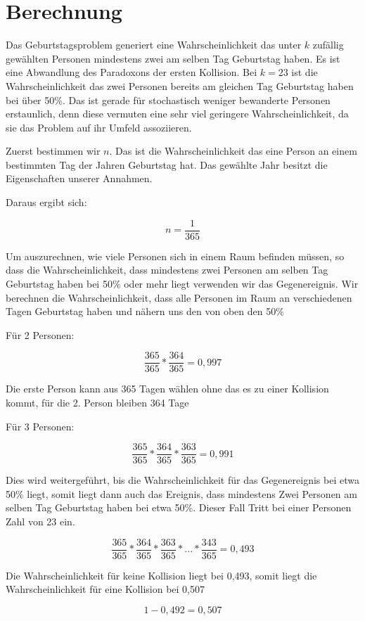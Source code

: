 \documentclass[../main.tex]{subfiles}
\begin{document}
\section{Berechnung}

Das Geburtstagsproblem generiert eine Wahrscheinlichkeit das unter \(k\) zufällig gewählten Personen mindestens zwei am
selben Tag Geburtstag haben. Es ist eine Abwandlung des Paradoxons der ersten Kollision. \cite{henze} Bei \(k=23\) ist die
Wahrscheinlichkeit das zwei Personen bereits am gleichen Tag Geburtstag haben bei über 50\%. Das ist gerade für
stochastisch weniger bewanderte Personen erstaunlich, denn diese vermuten eine sehr viel geringere Wahrscheinlichkeit,
da sie das Problem auf ihr Umfeld assoziieren.

Zuerst bestimmen wir \(n\). Das ist die Wahrscheinlichkeit das eine Person an einem bestimmten Tag der Jahren Geburtstag hat.
Das gewählte Jahr besitzt die Eigenschaften unserer Annahmen.

Daraus ergibt sich:

\begin{equation}
n = \frac{1}{365}
\end{equation}

Um auszurechnen, wie viele Personen sich in einem Raum befinden müssen, so dass die Wahrscheinlichkeit, dass mindestens zwei Personen am selben Tag Geburtstag haben bei 50\% oder mehr liegt verwenden wir das Gegenereignis. Wir berechnen die Wahrscheinlichkeit, dass alle Personen im Raum an verschiedenen Tagen Geburtstag haben und nähern uns den von oben den 50\%

Für 2 Personen:

\begin{equation}
 \frac{365}{365} * \frac{364}{365} = 0,997
\end{equation}

Die erste Person kann aus 365 Tagen wählen ohne das es zu einer Kollision kommt, für die 2. Person bleiben 364 Tage

Für 3 Personen:

\begin{equation}
 \frac{365}{365} * \frac{364}{365} * \frac{363}{365} = 0,991
\end{equation}

Dies wird weitergeführt, bis die Wahrscheinlichkeit für das Gegenereignis bei etwa 50\% liegt, somit liegt dann auch das Ereignis, dass mindestens Zwei Personen am selben Tag Geburtstag haben bei etwa 50\%. Dieser Fall Tritt bei einer Personen Zahl von 23 ein.

\begin{equation}
 \frac{365}{365} * \frac{364}{365} * \frac{363}{365} * ... * \frac{343}{365} = 0,493
\end{equation}

Die Wahrscheinlichkeit für keine Kollision liegt bei 0,493, somit liegt die Wahrscheinlichkeit für eine Kollision bei 0,507

\begin{equation}
 1-0,492 = 0,507
\end{equation}
\end{document}

